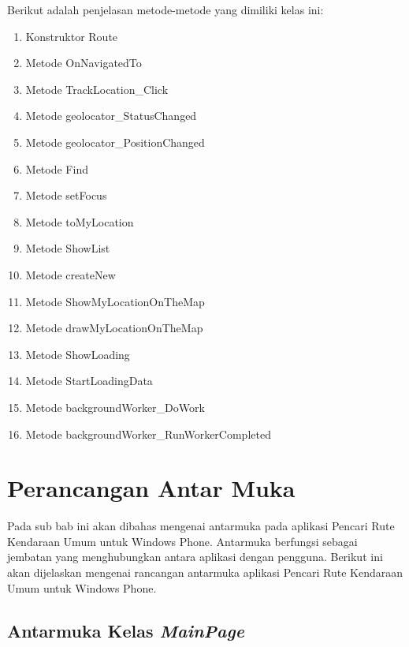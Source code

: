 Berikut adalah penjelasan metode-metode yang dimiliki kelas ini:
\begin{enumerate}
	\item Konstruktor Route
	\item Metode OnNavigatedTo
	\item Metode TrackLocation_Click
	\item Metode geolocator_StatusChanged
	\item Metode geolocator_PositionChanged
	\item Metode Find
	\item Metode setFocus
	\item Metode toMyLocation
	\item Metode ShowList
	\item Metode createNew
	\item Metode ShowMyLocationOnTheMap
	\item Metode drawMyLocationOnTheMap
	\item Metode ShowLoading
	\item Metode StartLoadingData
	\item Metode backgroundWorker_DoWork
	\item Metode backgroundWorker_RunWorkerCompleted
\end{enumerate}

\section{Perancangan Antar Muka}
\label{lab:Perancangan Kelas}
\hspace{0.5cm} Pada sub bab ini akan dibahas mengenai antarmuka pada aplikasi Pencari Rute Kendaraan Umum untuk Windows Phone. Antarmuka berfungsi sebagai jembatan yang menghubungkan antara aplikasi dengan pengguna. Berikut ini akan dijelaskan mengenai rancangan antarmuka aplikasi Pencari Rute Kendaraan Umum untuk Windows Phone. 

\subsection{Antarmuka Kelas \textit{MainPage}}
\label{lab:Antarmuka Kelas MainPage}

